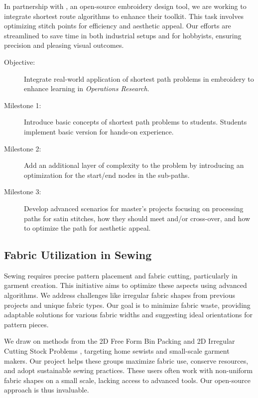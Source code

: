 \documentclass{article}
\begin{document}
    In partnership with \citet{inkstitch}, an open-source embroidery design tool, we are
    working to integrate shortest route algorithms to enhance their toolkit. This task
    involves optimizing stitch points for efficiency and aesthetic appeal. Our efforts are
    streamlined to save time in both industrial setups and for hobbyists, ensuring
    precision and pleasing visual outcomes.

    \begin{description}
        \item[Objective:] Integrate real-world application of shortest path problems in embroidery to enhance
        learning in \emph{Operations Research}.
        \item[Milestone 1:] Introduce basic concepts of shortest path problems to students.
        Students implement basic version for hands-on experience.
        \item[Milestone 2:] Add an additional layer of complexity to the problem by introducing an optimization for
        the start/end nodes in the sub-paths.
        \item[Milestone 3:] Develop advanced scenarios for master's projects focusing on processing paths for satin
        stitches, how they should meet and/or cross-over, and how to optimize the path for aesthetic appeal.
    \end{description}

    \subsection{Fabric Utilization in Sewing}

    Sewing requires precise pattern placement and fabric cutting, particularly in garment creation.
    This initiative aims to optimize these aspects using advanced algorithms. We address challenges
    like irregular fabric shapes from previous projects and unique fabric types. Our goal is to
    minimize fabric waste, providing adaptable solutions for various fabric widths and suggesting
    ideal orientations for pattern pieces.

    We draw on methods from the 2D Free Form Bin Packing and 2D Irregular Cutting Stock Problems
    \citep{bennell2009tutorial, xu2016efficient}, targeting home sewists and small-scale garment
    makers. Our project helps these groups maximize fabric use, conserve resources, and adopt
    sustainable sewing practices. These users often work with non-uniform fabric shapes on a
    small scale, lacking access to advanced tools. Our open-source approach is thus invaluable.
\end{document}
